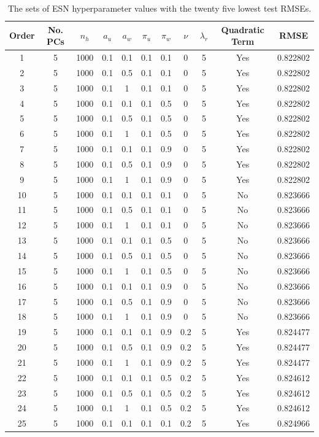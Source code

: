 \documentclass[AMS,STIX2COL]{WileyNJD-v2}
\begin{document}
\begin{table}[ht]
\centering
\begin{tabular}{ccccccccccc}
\hline
Order & No. PCs & $n_h$ & $a_u$ & $a_w$ & $\pi_u$ & $\pi_w$ & $\nu$ & $\lambda_r$ & Quadratic Term & RMSE \\
\hline
1 & 5 & 1000 & 0.1 & 0.1 & 0.1 & 0.1 & 0 & 5 & Yes & 0.822802 \\ 
2 & 5 & 1000 & 0.1 & 0.5 & 0.1 & 0.1 & 0 & 5 & Yes & 0.822802 \\ 
3 & 5 & 1000 & 0.1 & 1 & 0.1 & 0.1 & 0 & 5 & Yes & 0.822802 \\ 
4 & 5 & 1000 & 0.1 & 0.1 & 0.1 & 0.5 & 0 & 5 & Yes & 0.822802 \\ 
5 & 5 & 1000 & 0.1 & 0.5 & 0.1 & 0.5 & 0 & 5 & Yes & 0.822802 \\ 
6 & 5 & 1000 & 0.1 & 1 & 0.1 & 0.5 & 0 & 5 & Yes & 0.822802 \\ 
7 & 5 & 1000 & 0.1 & 0.1 & 0.1 & 0.9 & 0 & 5 & Yes & 0.822802 \\ 
8 & 5 & 1000 & 0.1 & 0.5 & 0.1 & 0.9 & 0 & 5 & Yes & 0.822802 \\ 
9 & 5 & 1000 & 0.1 & 1 & 0.1 & 0.9 & 0 & 5 & Yes & 0.822802 \\ 
10 & 5 & 1000 & 0.1 & 0.1 & 0.1 & 0.1 & 0 & 5 & No & 0.823666 \\ 
11 & 5 & 1000 & 0.1 & 0.5 & 0.1 & 0.1 & 0 & 5 & No & 0.823666 \\ 
12 & 5 & 1000 & 0.1 & 1 & 0.1 & 0.1 & 0 & 5 & No & 0.823666 \\ 
13 & 5 & 1000 & 0.1 & 0.1 & 0.1 & 0.5 & 0 & 5 & No & 0.823666 \\ 
14 & 5 & 1000 & 0.1 & 0.5 & 0.1 & 0.5 & 0 & 5 & No & 0.823666 \\ 
15 & 5 & 1000 & 0.1 & 1 & 0.1 & 0.5 & 0 & 5 & No & 0.823666 \\ 
16 & 5 & 1000 & 0.1 & 0.1 & 0.1 & 0.9 & 0 & 5 & No & 0.823666 \\ 
17 & 5 & 1000 & 0.1 & 0.5 & 0.1 & 0.9 & 0 & 5 & No & 0.823666 \\ 
18 & 5 & 1000 & 0.1 & 1 & 0.1 & 0.9 & 0 & 5 & No & 0.823666 \\ 
19 & 5 & 1000 & 0.1 & 0.1 & 0.1 & 0.9 & 0.2 & 5 & Yes & 0.824477 \\
20 & 5 & 1000 & 0.1 & 0.5 & 0.1 & 0.9 & 0.2 & 5 & Yes & 0.824477 \\
21 & 5 & 1000 & 0.1 & 1 & 0.1 & 0.9 & 0.2 & 5 & Yes & 0.824477 \\ 
22 & 5 & 1000 & 0.1 & 0.1 & 0.1 & 0.5 & 0.2 & 5 & Yes & 0.824612 \\
23 & 5 & 1000 & 0.1 & 0.5 & 0.1 & 0.5 & 0.2 & 5 & Yes & 0.824612 \\
24 & 5 & 1000 & 0.1 & 1 & 0.1 & 0.5 & 0.2 & 5 & Yes & 0.824612 \\ 
25 & 5 & 1000 & 0.1 & 0.1 & 0.1 & 0.1 & 0.2 & 5 & Yes & 0.824966 \\
\hline
\end{tabular}
\caption{The sets of ESN hyperparameter values with the twenty five lowest test RMSEs.}
\label{tab:hp_top}
\end{table}
\end{document}
